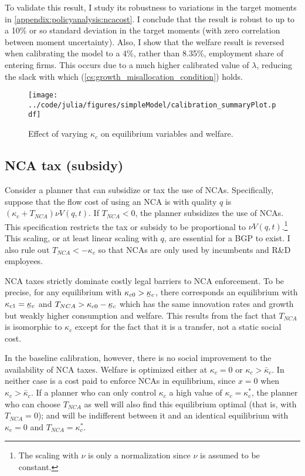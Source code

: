 \documentclass[11pt,english]{article}
\newcommand\munderbar[1]{%
	\underaccent{\bar}{#1}}
\begin{document}
To validate this result, I study its robustness to variations in the target moments in \ref{appendix:policyanalysis:ncacost}. I conclude that the result is robust to up to a 10\% or so standard deviation in the target moments (with zero correlation between moment uncertainty). Also, I show that the welfare result is reversed when calibrating the model to a 4\%, rather than 8.35\%, employment share of entering firms. This occurs due to a much higher calibrated value of $\lambda$, reducing the slack with which (\ref{cs:growth_misallocation_condition}) holds.  

\begin{figure}[]
	\texttt{[image: ../code/julia/figures/simpleModel/calibration\_summaryPlot.pdf]}
	\caption{Effect of varying $\kappa_c$ on equilibrium variables and welfare.}
	\label{calibration_summaryPlot}
\end{figure}

\subsection{NCA tax (subsidy)}

Consider a planner that can subsidize or tax the use of NCAs. Specifically, suppose that the flow cost of using an NCA is with quality $q$ is $(\kappa_c + T_{NCA})\nu  V(q,t)$. If $T_{NCA} < 0$, the planner subsidizes the use of NCAs. This specification restricts the tax or subsidy to be proportional to $\nu V(q,t)$.\footnote{The scaling with $\nu$ is only a normalization since $\nu$ is assumed to be constant.} This scaling, or at least linear scaling with $q$, are essential for a BGP to exist. I also rule out $T_{NCA} < -\kappa_c$ so that NCAs are only used by incumbents and R\&D employees.

NCA taxes strictly dominate costly legal barriers to NCA enforcement. To be precise, for any equilibrium with $\kappa_{c0} > \munderbar{\kappa}_c$, there corresponds an equilibrium with $\kappa_{c1} = \munderbar{\kappa}_c$ and $T_{NCA} > \kappa_{c0} - \munderbar{\kappa}_c$ which has the same innovation rates and growth but weakly higher consumption and welfare. This results from the fact that $T_{NCA}$ is isomorphic to $\kappa_c$ except for the fact that it is a transfer, not a static social cost. 

In the baseline calibration, however, there is no social improvement to the availability of NCA taxes. Welfare is optimized either at $\kappa_c = 0$ or $\kappa_c > \bar{\kappa}_c$. In neither case is a cost paid to enforce NCAs in equilibrium, since $x = 0$ when $\kappa_c > \bar{\kappa}_c$. If a planner who can only control $\kappa_c$ a high value of $\kappa_c = \kappa_c^*$, the planner who can choose $T_{NCA}$ as well will also find this equilibrium optimal (that is, with $T_{NCA} = 0$); and will be indifferent between it and an identical equilibrium with $\kappa_c = 0$ and $T_{NCA} = \kappa_c^*$. 
\end{document}
